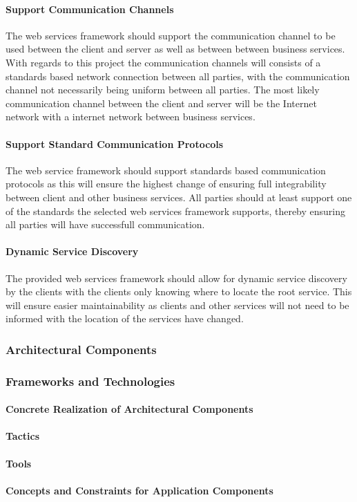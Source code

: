 \paragraph{Support Communication Channels}
The web services framework should support the communication channel to be used
between the client and server as well as between between business services.
With regards to this project the communication channels will consists of a
standards based network connection between all parties, with the communication
channel not necessarily being uniform between all parties. The most likely
communication channel between the client and server will be the Internet
network with a internet network between business services.

\paragraph{Support Standard Communication Protocols}
The web service framework should support standards based communication
protocols as this will ensure the highest change of ensuring full
integrability between client and other business services. All parties should
at least support one of the standards the selected web services framework
supports, thereby ensuring all parties will have successfull communication.

\paragraph{Dynamic Service Discovery}
The provided web services framework should allow for dynamic service discovery
by the clients with the clients only knowing where to locate the root service.
This will ensure easier maintainability as clients and other services will not
need to be informed with the location of the services have changed.

\subsubsection{Architectural Components}
\subsubsection{Frameworks and Technologies}
\paragraph{Concrete Realization of Architectural Components}
\paragraph{Tactics}
\paragraph{Tools}
\paragraph{Concepts and Constraints for Application Components}